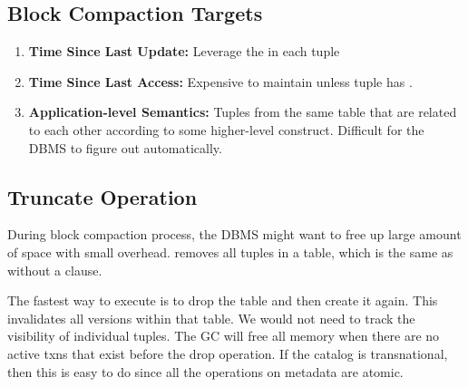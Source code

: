\documentclass[11pt]{article}
\begin{document}
\subsection*{Block Compaction Targets}
\begin{enumerate}
    \item \textbf{Time Since Last Update:} Leverage the  in each tuple
    \item \textbf{Time Since Last Access:} Expensive to maintain unless tuple has .
    \item \textbf{Application-level Semantics:} Tuples from the same table that are related to each other according to some higher-level construct. Difficult for the DBMS to figure out automatically.
\end{enumerate}
\subsection*{Truncate Operation}
During block compaction process, the DBMS might want to free up large amount of space with small overhead.  removes all tuples in a table, which is the same as  without a  clause. 

The fastest way to execute  is to drop the table and then create it again. This invalidates all versions within that table. We would not need to track the visibility of individual tuples. The GC will free all memory when there are no active txns that exist before the drop operation. If the catalog is transnational, then this is easy to do since all the operations on metadata are atomic.
\newpage


\end{document}
